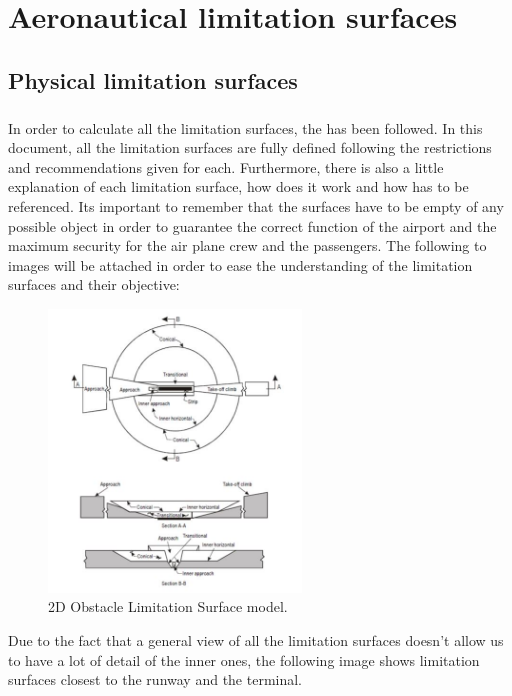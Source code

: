 \chapter{Aeronautical limitation surfaces}
	\section{Physical limitation surfaces}
	\paragraph{} In order to calculate all the limitation surfaces, the \cite{Standards2016} has been followed. In this document, all the limitation surfaces are fully defined following the restrictions and recommendations given for each. Furthermore, there is also a little explanation of each limitation surface, how does it work and how has to be referenced. Its important to remember that the surfaces have to be empty of any possible object in order to guarantee the correct function of the airport and the maximum security for the air plane crew and the passengers. The following to images will be attached in order to ease the understanding of the limitation surfaces and their objective:
	
	\begin{figure}[H]
		\centering
		\includegraphics[clip, trim=0cm 0cm 0cm 0cm, width=0.60\textwidth]{./images/servidumbres/servidumbres}
		\caption{2D Obstacle Limitation Surface model.}
		\label{}
	\end{figure}
	 
	 Due to the fact that a general view of all the limitation surfaces doesn't allow us to have a lot of detail of the inner ones, the following image shows limitation surfaces closest to the runway and the terminal.
	 
